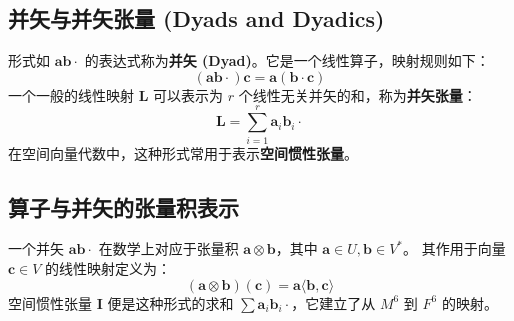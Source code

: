 \subsection{并矢与并矢张量 (Dyads and Dyadics)}
形式如 $\boldsymbol{a}\boldsymbol{b}\cdot$ 的表达式称为\textbf{并矢 (Dyad)}。它是一个线性算子，映射规则如下：
\begin{equation}
(\boldsymbol{a}\boldsymbol{b}\cdot) \boldsymbol{c} = \boldsymbol{a}(\boldsymbol{b} \cdot \boldsymbol{c})
\end{equation}
一个一般的线性映射 $\mathbf{L}$ 可以表示为 $r$ 个线性无关并矢的和，称为\textbf{并矢张量}：
\begin{equation}
\mathbf{L} = \sum_{i=1}^r \boldsymbol{a}_i \boldsymbol{b}_i \cdot
\end{equation}
在空间向量代数中，这种形式常用于表示\textbf{空间惯性张量}。

\subsection{算子与并矢的张量积表示}
一个并矢 $\boldsymbol{a}\boldsymbol{b}\cdot$ 在数学上对应于张量积 $\boldsymbol{a} \otimes \boldsymbol{b}$，其中 $\boldsymbol{a} \in U, \boldsymbol{b} \in V^*$。
其作用于向量 $\boldsymbol{c} \in V$ 的线性映射定义为：
\begin{equation}
(\boldsymbol{a} \otimes \boldsymbol{b})(\boldsymbol{c}) = \boldsymbol{a} \langle \boldsymbol{b}, \boldsymbol{c} \rangle
\end{equation}
空间惯性张量 $\mathbf{I}$ 便是这种形式的求和 $\sum \boldsymbol{a}_i \boldsymbol{b}_i \cdot$，它建立了从 $M^6$ 到 $F^6$ 的映射。

